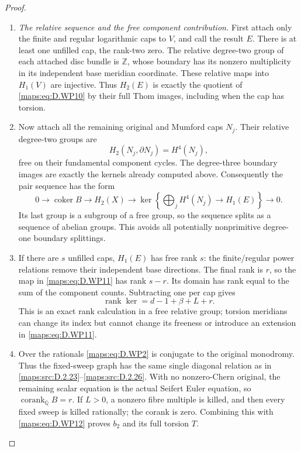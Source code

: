 \begin{proof}
\begin{enumerate}[label=\arabic*.,leftmargin=*]
\item \emph{The relative sequence and the free component contribution.}
First attach only the finite and regular logarithmic
caps to $V$, and call the result $E$. There is at
least one unfilled cap, the rank-two zero.
The relative degree-two group of each attached
disc bundle is $\mathbb Z$, whose boundary has
its nonzero multiplicity in its independent base
meridian coordinate. These relative maps into
$H_1(V)$ are injective. Thus $H_2(E)$ is exactly
the quotient of \eqref{maps:eq:D.WP10} by their full Thom
images, including when the cap has torsion.

\item Now attach all the remaining original and Mumford
caps $N_j$. Their relative degree-two groups are
\[
 H_2(N_j,\partial N_j)=H^4(N_j),
\]
free on their fundamental component cycles.
The degree-three boundary images are exactly
the kernels already computed above. Consequently
the pair sequence has the form
\[
 0\longrightarrow\operatorname{coker}B
 \longrightarrow H_2(X)
 \longrightarrow
 \ker\!\left\{\bigoplus_j H^4(N_j)\to H_1(E)\right\}
 \longrightarrow0.                                      \tag{D.WP11}\label{maps:eq:D.WP11}
\]
Its last group is a subgroup of a free group,
so the sequence splits as a sequence of abelian
groups. This avoids all potentially nonprimitive
degree-one boundary splittings.

\item If there are $s$ unfilled caps, $H_1(E)$ has free
rank $s$: the finite/regular power relations
remove their independent base directions.
The final rank is $r$, so the map in \eqref{maps:eq:D.WP11}
has rank $s-r$. Its domain has rank equal to
the sum of the component counts. Subtracting
one per cap gives
\[
 \operatorname{rank}\ker
   =d-1+\beta+L+r.                                        \tag{D.WP12}\label{maps:eq:D.WP12}
\]
This is an exact rank calculation in a free
relative group; torsion meridians can change
its index but cannot change its freeness or
introduce an extension in \eqref{maps:eq:D.WP11}.

\item Over the rationals \eqref{maps:eq:D.WP2} is conjugate to the
original monodromy. Thus the fixed-sweep graph
has the same single diagonal relation as in
\ref{maps:src:D.2.23}--\ref{maps:src:D.2.26}. With no nonzero-Chern original,
the remaining scalar equation is the actual
Seifert Euler equation, so
$\operatorname{corank}_{\mathbb Q}B=r$.
If $L>0$, a nonzero fibre multiple is killed,
and then every fixed sweep is killed rationally;
the corank is zero. Combining this with
\eqref{maps:eq:D.WP12} proves $b_2$ and its full torsion $T$.


\end{enumerate}
\end{proof}

